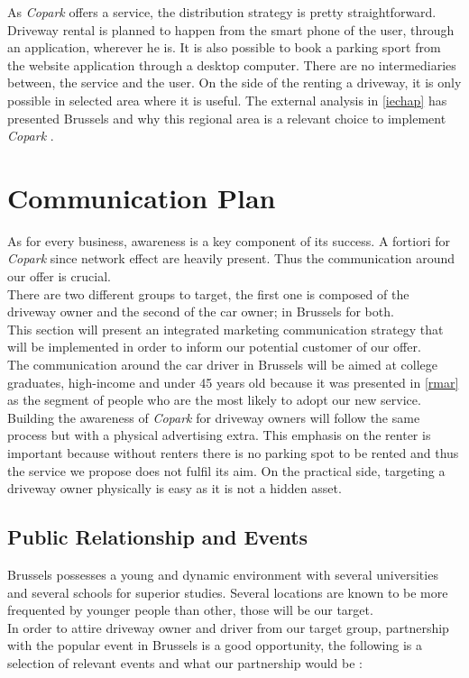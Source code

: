 \documentclass[12pt,a4paper,oneside]{book}
\newcommand{\bp}{\textit{Copark }}
\begin{document}
As \bp offers a service, the distribution strategy is pretty straightforward. Driveway rental is planned to happen from the smart phone of the user, through an application, wherever he is. It is also possible to book a parking sport from the website application through a desktop computer. There are no intermediaries between, the service and the user. On the side of the renting a driveway, it is only possible in selected area where it is useful. The external analysis in \autoref{iechap} has presented Brussels and why this regional area is a relevant choice to implement \bp.

\section{Communication Plan}

As for every business, awareness is a key component of its success. A fortiori for \bp since network effect are heavily present. Thus the communication around our offer is crucial.\\
There are two different groups to target, the first one is composed of the driveway owner and the second of the car owner; in Brussels for both.\\
This section will present an integrated marketing communication strategy that will be implemented in order to inform our potential customer of our offer.\\
The communication around the car driver in Brussels will be aimed at college graduates, high-income and under 45 years old because it was presented in \autoref{rmar} as the segment of people who are the most likely to adopt our new service. Building the awareness of \bp for driveway owners will follow the same process but with a physical advertising extra. This emphasis on the renter is important because without renters there is no parking spot to be rented and thus the service we propose does not fulfil its aim. On the practical side, targeting a driveway owner physically is easy as it is not a hidden asset.

\subsection{Public Relationship and Events}
\label{praess}
Brussels possesses a young and dynamic environment with several universities and several schools for superior studies. Several locations are known to be more frequented by younger people than other, those will be our target.\\
In order to attire driveway owner and driver from our target group, partnership with the popular event in Brussels is a good opportunity, the following is a selection of relevant events and what our partnership would be :
\end{document}
